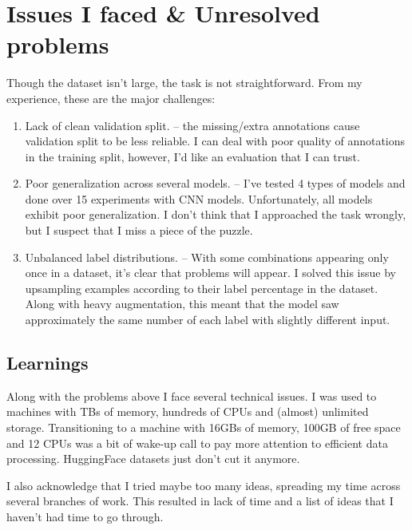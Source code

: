 \documentclass[11pt]{article}
\begin{document}
\section{Issues I faced \& Unresolved problems}\label{section:issues}

Though the dataset isn't large, the task is not straightforward. From my
experience, these are the major challenges:

\begin{enumerate}

  \item Lack of clean validation split. -- the missing/extra annotations cause
    validation split to be less reliable. I can deal with poor quality of
    annotations in the training split, however, I'd like an evaluation that I
    can trust.

  \item Poor generalization across several models. -- I've tested 4 types of
    models and done over 15 experiments with CNN models. Unfortunately, all
    models exhibit poor generalization. I don't think that I approached the
    task wrongly, but I suspect that I miss a piece of the puzzle.

  \item Unbalanced label distributions. -- With some combinations appearing
    only once in a dataset, it's clear that problems will appear. I solved this
    issue by upsampling examples according to their label percentage in the
    dataset. Along with heavy augmentation, this meant that the model saw
    approximately the same number of each label with slightly different input.

\end{enumerate}

\subsection{Learnings}

Along with the problems above I face several technical issues. I was used to
machines with TBs of memory, hundreds of CPUs and (almost) unlimited storage.
Transitioning to a machine with 16GBs of memory, 100GB of free space and 12
CPUs was a bit of wake-up call to pay more attention to efficient data
processing. HuggingFace datasets just don't cut it anymore.

I also acknowledge that I tried maybe too many ideas, spreading my time across
several branches of work. This resulted in lack of time and a list of ideas
that I haven't had time to go through.
\end{document}
